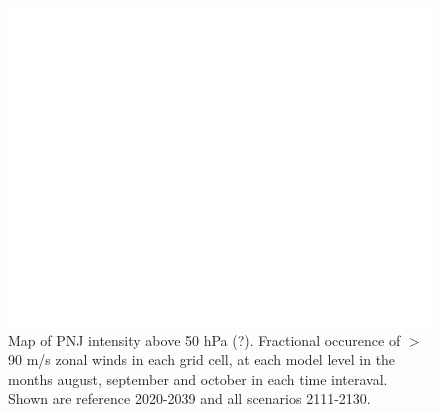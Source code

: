 \begin{figure}[H]
    \centering
    \includegraphics[width=\linewidth]{images/TREFHT_ann.eps}
    \caption{Map of PNJ intensity above 50 hPa (?). Fractional occurence of $>$90 m/s zonal winds in each grid cell, at each model level in the months august, september and october in each time interaval. Shown are reference 2020-2039 and all scenarios 2111-2130.}
    \label{fig:PNJ_map}
\end{figure}
